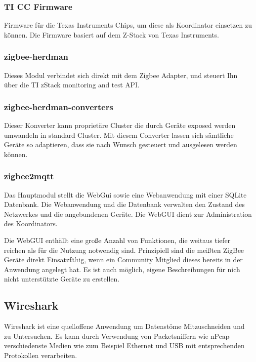 \subsubsection{TI CC Firmware}

Firmware für die Texas Instruments Chips, um diese als Koordinator einsetzen zu können. Die Firmware basiert auf dem Z-Stack von Texas Instruments.

\subsubsection{zigbee-herdman}

Dieses Modul verbindet sich direkt mit dem Zigbee Adapter, und steuert Ihn über die TI zStack monitoring and test API. \cite{zstack}

\subsubsection{zigbee-herdman-converters}

Dieser Konverter kann proprietäre Cluster die durch Geräte exposed werden umwandeln in standard Cluster. Mit diesem Converter lassen sich sämtliche Geräte
so adaptieren, dass sie nach Wunsch gesteuert und ausgelesen werden können.

\subsubsection{zigbee2mqtt}

Das Hauptmodul stellt die WebGui sowie eine Webanwendung mit einer SQLite Datenbank. Die Webanwendung und die Datenbank
verwalten den Zustand des Netzwerkes und die angebundenen Geräte. Die WebGUI dient zur Administration des Koordinators.


Die WebGUI enthällt eine große Anzahl von Funktionen, die weitaus tiefer reichen als für die Nutzung notwendig sind.
Prinzipiell sind die meißten ZigBee Geräte direkt Einsatzfähig, wenn ein Community Mitglied dieses bereits in der Anwendung
angelegt hat. Es ist auch möglich, eigene Beschreibungen für nich nicht unterstützte Geräte zu erstellen.


\subsection{Wireshark}

Wireshark ist eine quelloffene Anwendung um Datenstöme Mitzuschneiden und zu Untersuchen. Es kann durch Verwendung
von Packetsniffern wie nPcap verschiedenste Medien wie zum Beispiel Ethernet und USB mit entsprechenden Protokollen
verarbeiten.

